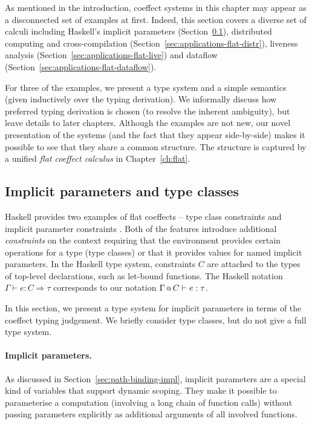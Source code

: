 As mentioned in the introduction, coeffect systems in this chapter may appear as a disconnected
set of examples at first. Indeed, this section covers a diverse set of calculi including
Haskell's implicit parameters (Section~\ref{sec:applications-flat-impl}), distributed computing and
cross-compilation (Section~\ref{sec:applications-flat-distr}), liveness analysis
(Section~\ref{sec:applications-flat-live}) and dataflow (Section~\ref{sec:applications-flat-dataflow}).

For three of the examples, we present a type system and a simple semantics (given inductively over
the typing derivation). We informally discuss how preferred typing derivation is chosen (to resolve
the inherent ambiguity), but leave details to later chapters. Although the examples
are not new, our novel presentation of the systems (and the fact that they appear side-by-side)
makes it possible to see that they share a common structure. The structure is captured by
a unified \emph{flat coeffect calculus} in Chapter~\ref{ch:flat}.


\subsection{Implicit parameters and type classes}
\label{sec:applications-flat-impl}

Haskell provides two examples of flat coeffects -- type class constraints and implicit parameter
constraints \cite{app-type-classes,app-implicit-parameters}. Both of the features introduce additional
\emph{constraints} on the context requiring that the environment provides certain operations for
a type (type classes) or that it provides values for named implicit parameters.
In the Haskell type system, constraints $C$ are attached to the types of top-level declarations,
such as let-bound functions. The Haskell notation $\Gamma \vdash e : C \Rightarrow \tau$
corresponds to our notation $\Gamma \,\text{\scriptsize @}\, {{\text{$C$}}} \vdash e : \tau$.

In this section, we present a type system for implicit parameters in terms of the coeffect typing
judgement. We briefly consider type classes, but do not give a full type system.

\paragraph{Implicit parameters.}
As discussed in Section~\ref{sec:path-binding-impl}, implicit parameters are a special kind of
variables that support dynamic scoping. They make it possible to parameterise a computation
(involving a long chain of function calls) without passing parameters explicitly as additional
arguments of all involved functions.


